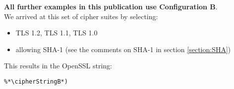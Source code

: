 \textbf{All further examples in this publication use Configuration B}.\\

We arrived at this set of cipher suites by selecting:

\begin{itemize}
\item TLS 1.2, TLS 1.1, TLS 1.0
\item allowing SHA-1 (see the comments on SHA-1 in section \ref{section:SHA})

\end{itemize}

This results in the OpenSSL string:

\begin{lstlisting}
%*\cipherStringB*)
\end{lstlisting}

